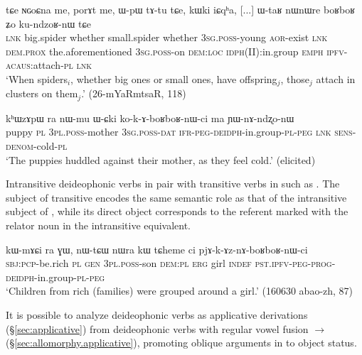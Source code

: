 \begin{exe}
\ex \label{ex:boRboR.kundzoRnW}
\gll tɕe ɴɢoɕna me, porɤt me, ɯ-pɯ tɤ-tu tɕe, kɯki iɕqʰa, [...] ɯ-taʁ nɯnɯre boʁboʁ ʑo ku-ndzoʁ-nɯ tɕe \\
\textsc{lnk} big.spider whether small.spider whether \textsc{3sg}.\textsc{poss}-young \textsc{aor}-exist \textsc{lnk} \textsc{dem}.\textsc{prox} the.aforementioned { } \textsc{3sg}.\textsc{poss}-on \textsc{dem}:\textsc{loc} \textsc{idph}(II):in.group \textsc{emph} \textsc{ipfv}-\textsc{acaus}:attach-\textsc{pl} \textsc{lnk} \\
\glt `When spiders$_i$, whether big ones or small ones, have offspring$_j$, those$_j$ attach in clusters on them$_j$.' (26-mYaRmtsaR, 118) 
\end{exe}

\begin{exe}
\ex \label{ex:kokAboRboRnW}
\gll kʰɯzɤpɯ ra nɯ-mu ɯ-ɕki ko-k-ɤ-boʁboʁ-nɯ-ci ma ɲɯ-nɤ-ndʐo-nɯ \\
puppy \textsc{pl} \textsc{3pl}.\textsc{poss}-mother \textsc{3sg}.\textsc{poss}-\textsc{dat} \textsc{ifr}-\textsc{peg}-\textsc{deidph}-in.group-\textsc{pl}-\textsc{peg} \textsc{lnk} \textsc{sens}-\textsc{denom}-cold-\textsc{pl} \\
\glt `The puppies huddled against their mother, as they feel cold.' (elicited)
\end{exe}

Intransitive deideophonic verbs in   pair with transitive verbs in  such as . The subject of transitive  encodes the same semantic role as that of the intransitive subject of , while its direct object corresponds to the referent marked with the relator noun  in the intransitive equivalent.

\begin{exe}
\ex \label{ex:pjAkAznAboRboRnWci}
\gll kɯ-mɤɕi ra ɣɯ, nɯ-tɕɯ nɯra kɯ tɕheme ci pjɤ-k-ɤz-nɤ-boʁboʁ-nɯ-ci \\
\textsc{sbj}:\textsc{pcp}-be.rich \textsc{pl} \textsc{gen} \textsc{3pl}.\textsc{poss}-son \textsc{dem}:\textsc{pl} \textsc{erg} girl \textsc{indef} \textsc{pst}.\textsc{ipfv}-\textsc{peg}-\textsc{prog}-\textsc{deidph}-in.group-\textsc{pl}-\textsc{peg} \\
\glt `Children from rich (families) were grouped around a girl.' (160630 abao-zh, 87)
\end{exe}

It is possible to analyze  deideophonic verbs as applicative derivations (§\ref{sec:applicative}) from  deideophonic verbs with regular vowel fusion  $\rightarrow$  (§\ref{sec:allomorphy.applicative}), promoting oblique arguments in  to object status.

